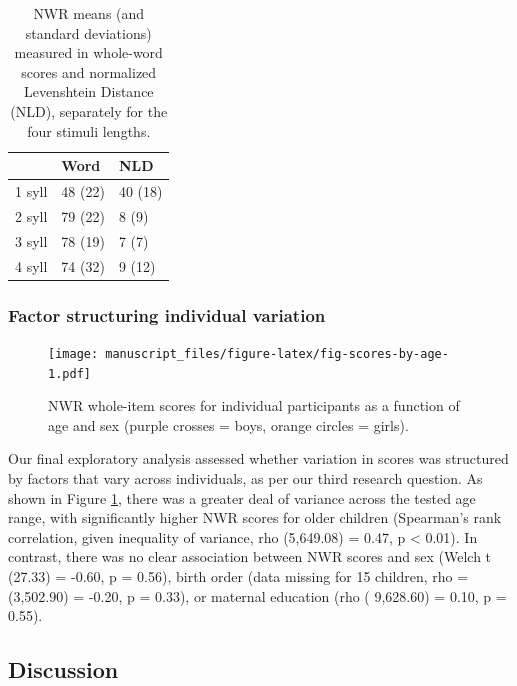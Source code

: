 \documentclass[english,,man,floatsintext]{apa6}
\begin{document}
\begin{table}

\caption{\label{tab:tablength}NWR means (and standard deviations) measured in whole-word scores and normalized Levenshtein Distance (NLD), separately for the four stimuli lengths.}
\centering
\begin{tabular}[t]{lll}
\toprule
  & Word & NLD\\
\midrule
1 syll & 48 (22) & 40 (18)\\
2 syll & 79 (22) & 8 (9)\\
3 syll & 78 (19) & 7 (7)\\
4 syll & 74 (32) & 9 (12)\\
\bottomrule
\end{tabular}
\end{table}

\hypertarget{factor-structuring-individual-variation}{%
\subsubsection{Factor structuring individual variation}\label{factor-structuring-individual-variation}}

\begin{figure}
\centering
\texttt{[image: manuscript\_files/figure-latex/fig-scores-by-age-1.pdf]}
\caption{\label{fig:fig-scores-by-age}NWR whole-item scores for individual participants as a function of age and sex (purple crosses = boys, orange circles = girls).}
\end{figure}

Our final exploratory analysis assessed whether variation in scores was structured by factors that vary across individuals, as per our third research question. As shown in Figure \ref{fig:fig-scores-by-age}, there was a greater deal of variance across the tested age range, with significantly higher NWR scores for older children (Spearman's rank correlation, given inequality of variance, rho (5,649.08) = 0.47, p \textless{} 0.01). In contrast, there was no clear association between NWR scores and sex (Welch t (27.33) = -0.60, p = 0.56), birth order (data missing for 15 children, rho = (3,502.90) = -0.20, p = 0.33), or maternal education (rho ( 9,628.60) = 0.10, p = 0.55).

\hypertarget{discussion}{%
\subsection{Discussion}\label{discussion}}
\end{document}
